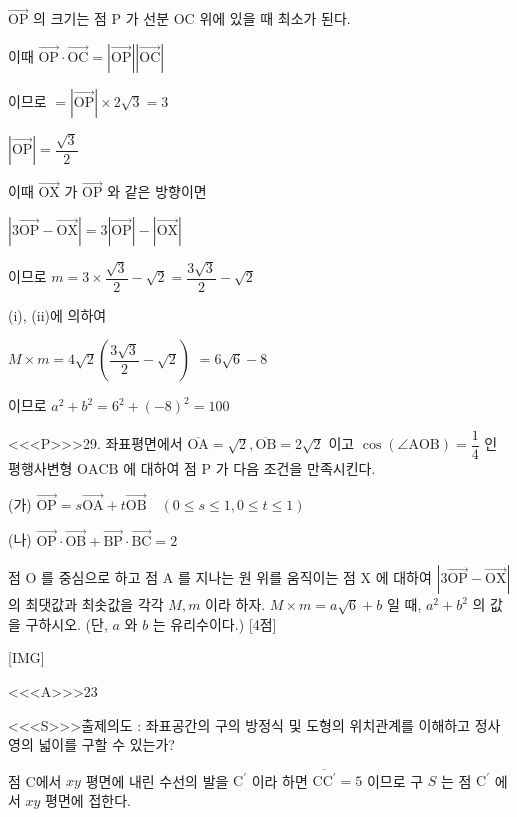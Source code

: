 \documentclass{oblivoir}
\begin{document}
$\overrightarrow{\mathrm{OP}}$ 의 크기는 점 $\mathrm{P}$ 가 선분 $\mathrm{OC}$ 위에 있을 때 최소가 된다.

이때
$\overrightarrow{\mathrm{OP}} \cdot \overrightarrow{\mathrm{OC}}=|\overrightarrow{\mathrm{OP}}||\overrightarrow{\mathrm{OC}}|$

이므로 $=|\overrightarrow{\mathrm{OP}}| \times 2 \sqrt{3}=3$

$|\overrightarrow{\mathrm{OP}}|=\dfrac{\sqrt{3}}{2}$

이때 $\overrightarrow{\mathrm{OX}}$ 가 $\overrightarrow{\mathrm{OP}}$ 와 같은 방향이면

$|3 \overrightarrow{\mathrm{OP}}-\overrightarrow{\mathrm{OX}}|=3|\overrightarrow{\mathrm{OP}}|-|\overrightarrow{\mathrm{OX}}|$

이므로 $m=3 \times \dfrac{\sqrt{3}}{2}-\sqrt{2}=\dfrac{3 \sqrt{3}}{2}-\sqrt{2}$

(i), (ii)에 의하여

$M \times m =4 \sqrt{2}\left(\dfrac{3 \sqrt{3}}{2}-\sqrt{2}\right)$
$=6 \sqrt{6}-8$

이므로 $a^{2}+b^{2} =6^{2}+(-8)^{2} =100$



<<<P>>>29. 좌표평면에서 $\overline{\mathrm{OA}}=\sqrt{2}, \overline{\mathrm{OB}}=2 \sqrt{2}$ 이고 $\cos (\angle \mathrm{AOB})=\dfrac{1}{4}$ 인 평행사변형 $\mathrm{OACB}$ 에 대하여 점 $\mathrm{P}$ 가 다음 조건을 만족시킨다.

(가) $\overrightarrow{\mathrm{OP}}=s \overrightarrow{\mathrm{OA}}+t \overrightarrow{\mathrm{OB}} \quad(0 \leq s \leq 1,0 \leq t \leq 1)$

(나) $\overrightarrow{\mathrm{OP}} \cdot \overrightarrow{\mathrm{OB}}+\overrightarrow{\mathrm{BP}} \cdot \overrightarrow{\mathrm{BC}}=2$

점 $\mathrm{O}$ 를 중심으로 하고 점 $\mathrm{A}$ 를 지나는 원 위를 움직이는 점 $\mathrm{X}$ 에 대하여 $|3 \overrightarrow{\mathrm{OP}}-\overrightarrow{\mathrm{OX}}|$ 의 최댓값과 최솟값을 각각 $M, m$ 이라 하자. $M \times m=a \sqrt{6}+b$ 일 때, $a^{2}+b^{2}$ 의 값을 구하시오. (단, $a$ 와 $b$ 는 유리수이다.) [4점]

[IMG]

<<<A>>>$23$

<<<S>>>출제의도 : 좌표공간의 구의 방정식 및 도형의 위치관계를 이해하고 정사영의 넓이를 구할 수 있는가?

점 C에서 $x y$ 평면에 내린 수선의 발을 $\mathrm{C}^{\prime}$ 이라 하면 $\overline{\mathrm{CC}^{\prime}}=5$ 이므로 구 $S$ 는 점 $\mathrm{C}^{\prime}$ 에서 $x y$ 평면에 접한다.
\end{document}
